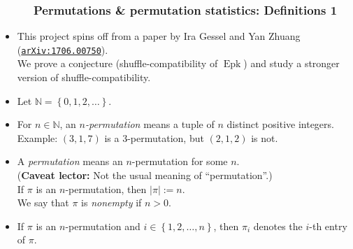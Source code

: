 \documentclass{beamer}
\newcommand{\red}{\color{red}}
\newcommand{\NN}{{\mathbb N}}
\newcommand{\Epk}{\operatorname{Epk}}
\newcommand\arxiv[1]{\href{http://www.arxiv.org/abs/#1}{\texttt{arXiv:#1}}}
\newcommand{\fti}[1]{\frametitle{\ \ \ \ \ #1}}
\newcommand{\set}[1]{\left\{ #1 \right\}}
\newcommand{\abs}[1]{\left| #1 \right|}
\newcommand{\tup}[1]{\left( #1 \right)}
\newcommand{\defn}[1]{{\color{darkred}\emph{#1}}} %
\theoremstyle{plain}
\begin{document}
\begin{frame}
\fti{Permutations \& permutation statistics: Definitions 1}

\begin{itemize}

\item This project spins off from a paper by Ira Gessel and Yan Zhuang
({\red \arxiv{1706.00750}}). \\
We prove a conjecture (shuffle-compatibility of $\Epk$)
and study a stronger version of shuffle-compatibility.

\pause

\item Let $\NN = \set{0, 1, 2, \ldots}$.

\item For $n \in \NN$, an \defn{$n$-permutation} means a tuple of $n$
distinct positive integers. \\
Example: $\tup{3, 1, 7}$ is a $3$-permutation, but
         $\tup{2, 1, 2}$ is not.

\pause

\item A \defn{permutation} means an $n$-permutation for some $n$. \\
      (\textbf{Caveat lector:} Not the usual meaning of ``permutation''.) \\
      \pause
      If $\pi$ is an $n$-permutation, then \defn{$\abs{\pi} := n$}. \\ \pause
      We say that $\pi$ is \defn{nonempty} if $n > 0$.

\pause

\item If $\pi$ is an $n$-permutation and $i \in \set{1, 2, \ldots, n}$,
      then \defn{$\pi_i$} denotes the $i$-th entry of $\pi$.

\end{itemize}
\end{frame}
\end{document}
